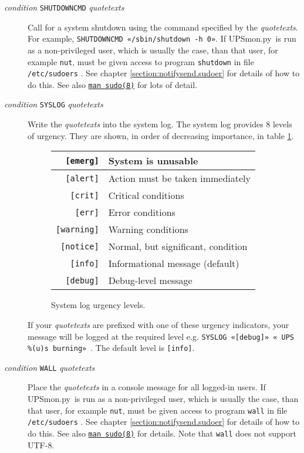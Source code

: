 \documentclass[12pt]{article}
\newcommand{\UPSmon}{\mbox{\textcolor{UPSMONCOLOUR}{UPSmon.py}}}
\newcommand{\LINman}[2]{\href{https://man7.org/linux/man-pages/man#2/#1.#2.html}{\texttt{man #1(#2)}}}
\begin{document}
\begin{description}
\begin{description}
\item[\textit{condition} \texttt{SHUTDOWNCMD}
  \textit{quotetexts}] \hspace{7mm} Call for a system shutdown using the
  command specified by the \textit{quotetexts}.  For example,
  \texttt{SHUTDOWNCMD «/sbin/shutdown -h 0»}. If \UPSmon\ is run as a
  non-privileged user, which is usually the case, than that user, for example
  \texttt{nut}, must be given access to program \texttt{shutdown} in file
  \texttt{/etc/sudoers} .  See chapter \ref{section:notifysend.sudoer} for
  details of how to do this.  See also \LINman{sudo}{8} for lots of detail.

\item[\textit{condition} \texttt{SYSLOG} \textit{quotetexts}] \hspace{7mm}
  Write the \textit{quotetexts} into the system log.  The system log provides
  8 levels of urgency. They are shown, in order of decreasing importance, in
  table \ref{fig:syslog}.
\begin{figure}[ht]
\begin{center}
\begin{tabular}{|r|l|}
\hline
\texttt{[emerg]}   & System is unusable \\ \hline
\texttt{[alert]}   & Action must be taken immediately \\ \hline
\texttt{[crit]}    & Critical conditions \\ \hline
\texttt{[err]}     & Error conditions \\ \hline
\texttt{[warning]} & Warning conditions \\ \hline
\texttt{[notice]}  & Normal, but significant, condition \\ \hline
\texttt{[info]}    & Informational message (default)\\ \hline
\texttt{[debug]}   & Debug-level message \\ \hline
\end{tabular}
\caption{System log urgency levels.\label{fig:syslog}}
\end{center}
\end{figure}
If your \textit{quotetexts} are prefixed with one of these urgency indicators,
your message will be logged at the required level e.g. \texttt{SYSLOG
  «[debug]» « UPS \%(u)s burning»}\ .  The default level is \texttt{[info]}.

\item[\textit{condition} \texttt{WALL} \textit{quotetexts}] \hspace{7mm} Place
  the \textit{quotetexts} in a console message for all logged-in users.  If
  \UPSmon\ is run as a non-privileged user, which is usually the case, than
  that user, for example \texttt{nut}, must be given access to program
  \texttt{wall} in file \texttt{/etc/sudoers} .  See chapter
  \ref{section:notifysend.sudoer} for details of how to do this.  See also
  \LINman{sudo}{8} for details.  Note that \texttt{wall} does not support
  UTF-8.


\end{description}
\end{description}
\end{document}
